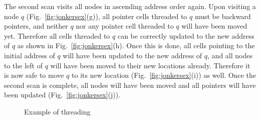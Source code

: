 \documentclass[10pt,a4paper,final,twocolumn]{article}
\begin{document}
The second scan visits all nodes in ascending address order again. Upon visiting a node
$q$ (Fig.~\ref{fig:jonkersex}(g)), all pointer cells threaded to $q$ must be backward pointers,
and neither $q$ nor any pointer cell threaded to $q$ will have been moved yet. Therefore all
cells threaded to $q$ can be correctly updated to the new address of $q$ as shown in
Fig.~\ref{fig:jonkersex}(h). Once this is done, all cells pointing to the initial address of
$q$ will have been updated to the new address of $q$, and all nodes to the left of $q$ will
have been moved to their new locations already. Therefore it is now safe to move $q$ to
its new location (Fig.~\ref{fig:jonkersex}(i)) as well. Once the second scan is complete, all
nodes will have been moved and all pointers will have been updated (Fig.~\ref{fig:jonkersex}(j)).

\begin{figure}[htb]
  \centering
  \caption{Example of threading}
  \label{fig:threadingex}
\end{figure}
\end{document}
